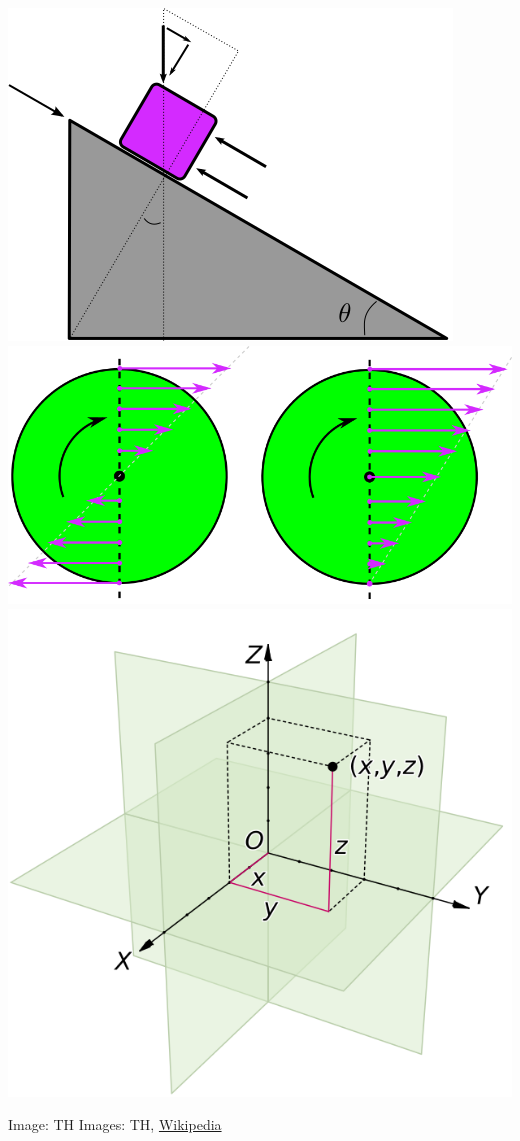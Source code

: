 \documentclass[fleqn]{beamer} %
\begin{document}
\begin{frame}
\begin{multicols}{2}
				\includegraphics[scale=0.209]{images/sliding_block.png}
				 \includegraphics[scale=0.125]{images/pure_roll_no_slip.png} 
				 \includegraphics[scale=0.17]{images/cartesian_3d.png}
				\end{multicols}
				{\tiny Image: TH\hspace{60mm} Images: TH, \href{https://en.wikipedia.org/wiki/Cartesian_coordinate_system}{Wikipedia} }

				\btVFill
			\end{frame}
\end{document}
